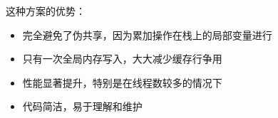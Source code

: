 这种方案的优势：
\begin{itemize}
    \item 完全避免了伪共享，因为累加操作在栈上的局部变量进行
    \item 只有一次全局内存写入，大大减少缓存行争用
    \item 性能显著提升，特别是在线程数较多的情况下
    \item 代码简洁，易于理解和维护
\end{itemize}